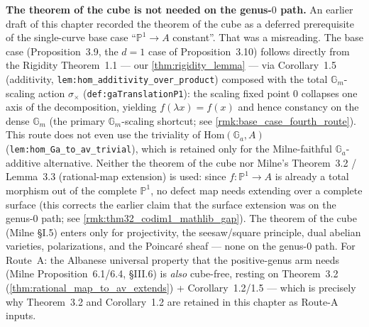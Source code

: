 \begin{remark}
  \label{rmk:cube_not_needed}
  \textbf{The theorem of the cube is not needed on the genus-\(0\) path.} An earlier draft of
  this chapter recorded the theorem of the cube as a deferred prerequisite of the single-curve
  base case ``\(\mathbb P^1 \to A\) constant''. That was a misreading. The base case
  (Proposition~3.9, the \(d = 1\) case of Proposition~3.10) follows directly from the Rigidity
  Theorem~1.1 --- our \cref{thm:rigidity_lemma} --- via Corollary~1.5 (additivity,
  \texttt{lem:hom_additivity_over_product}) composed with the total \(\mathbb G_m\)-scaling
  action \(\sigma_\times\) (\texttt{def:gaTranslationP1}): the scaling fixed point \(0\) collapses one
  axis of the decomposition, yielding \(f(\lambda x) = f(x)\) and hence constancy on the dense
  \(\mathbb G_m\) (the primary \(\mathbb G_m\)-scaling shortcut; see
  \cref{rmk:base_case_fourth_route}). This route does not even use the triviality of
  \(\mathrm{Hom}(\mathbb G_a, A)\) (\texttt{lem:hom_Ga_to_av_trivial}), which is retained only for the
  Milne-faithful \(\mathbb G_a\)-additive alternative. Neither the theorem of the cube nor Milne's Theorem~3.2 /
  Lemma~3.3 (rational-map extension) is used: since \(f \colon \mathbb P^1 \to A\) is already a
  total morphism out of the complete \(\mathbb P^1\), no defect map needs extending over a complete
  surface (this corrects the earlier claim that the surface extension was on the genus-\(0\) path;
  see \cref{rmk:thm32_codim1_mathlib_gap}). The theorem of the cube (Milne \S I.5) enters only for
  projectivity, the seesaw/square principle, dual abelian varieties, polarizations, and the
  Poincar\'e sheaf --- none on the genus-\(0\) path. For Route~A: the Albanese universal property
  that the positive-genus arm needs (Milne Proposition~6.1/6.4, \S III.6) is \emph{also} cube-free,
  resting on Theorem~3.2 (\cref{thm:rational_map_to_av_extends}) + Corollary~1.2/1.5 --- which is
  precisely why Theorem~3.2 and Corollary~1.2 are retained in this chapter as Route-A inputs.
\end{remark}
